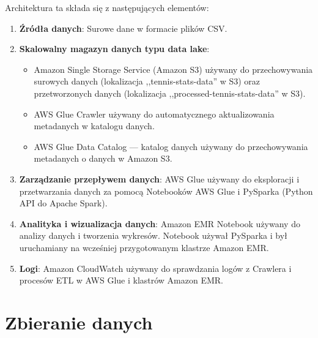 \documentclass[12pt, a4paper]{article}
\begin{document}
Architektura ta składa się z następujących elementów:
\begin{enumerate}
    \item \textbf{Źródła danych}: Surowe dane w formacie plików CSV.
    \item \textbf{Skalowalny magazyn danych typu data lake}: 
    \begin{itemize}
        \item Amazon Single Storage Service (Amazon S3) używany do przechowywania surowych danych (lokalizacja ,,tennis-stats-data'' w S3) oraz przetworzonych danych (lokalizacja ,,processed-tennis-stats-data'' w S3).
        \item AWS Glue Crawler używany do automatycznego aktualizowania metadanych w katalogu danych.
        \item AWS Glue Data Catalog --- katalog danych używany do przechowywania metadanych o danych w Amazon S3.
    \end{itemize}
    \item \textbf{Zarządzanie przepływem danych}: AWS Glue używany do eksploracji i przetwarzania danych za pomocą Notebooków AWS Glue i PySparka (Python API do Apache Spark).
    \item \textbf{Analityka i wizualizacja danych}:  Amazon EMR Notebook używany do analizy danych i tworzenia wykresów. Notebook używał PySparka i był uruchamiany na wcześniej przygotowanym klastrze Amazon EMR.
    \item \textbf{Logi}: Amazon CloudWatch używany do sprawdzania logów z Crawlera i procesów ETL w AWS Glue i klastrów Amazon EMR.

\end{enumerate}


\section{Zbieranie danych}
\end{document}
